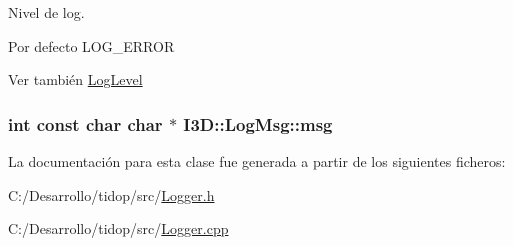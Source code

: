 Nivel de log. 

Por defecto L\+O\+G\+\_\+\+E\+R\+R\+OR \begin{DoxySeeAlso}{Ver también}
\hyperlink{namespace_i3_d_ae1af0f2e3b629610c45222809ff521f6}{Log\+Level} 
\end{DoxySeeAlso}
\subsubsection[{\texorpdfstring{msg}{msg}}]{\setlength{\rightskip}{0pt plus 5cm}int const char char $\ast$ I3\+D\+::\+Log\+Msg\+::msg}\hypertarget{class_i3_d_1_1_log_msg_a5a1ceb27d9529de8eb9b3fc9377e178a}{}\label{class_i3_d_1_1_log_msg_a5a1ceb27d9529de8eb9b3fc9377e178a}


La documentación para esta clase fue generada a partir de los siguientes ficheros\+:\begin{DoxyCompactItemize}
\item 
C\+:/\+Desarrollo/tidop/src/\hyperlink{_logger_8h}{Logger.\+h}\item 
C\+:/\+Desarrollo/tidop/src/\hyperlink{_logger_8cpp}{Logger.\+cpp}\end{DoxyCompactItemize}
